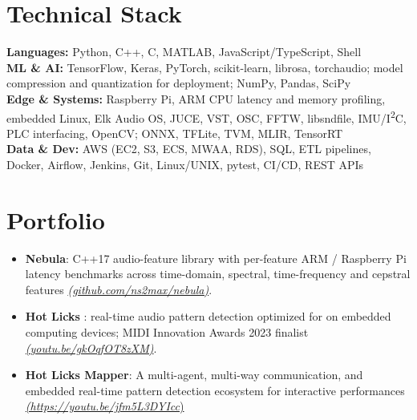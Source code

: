 \documentclass[11pt]{article}
\begin{document}
\section*{Technical Stack}

\textbf{Languages:} Python, C++, C, MATLAB, JavaScript/TypeScript, Shell\\
\textbf{ML \& AI:} TensorFlow, Keras, PyTorch, scikit-learn, librosa, torchaudio; model compression and quantization for deployment; NumPy, Pandas, SciPy\\
\textbf{Edge \& Systems:} Raspberry Pi, ARM CPU latency and memory profiling, embedded Linux, Elk Audio OS, JUCE, VST, OSC, FFTW, libsndfile, IMU/I\textsuperscript{2}C, PLC interfacing, OpenCV; ONNX, TFLite, TVM, MLIR, TensorRT\\
\textbf{Data \& Dev:} AWS (EC2, S3, ECS, MWAA, RDS), SQL, ETL pipelines, Docker, Airflow, Jenkins, Git, Linux/UNIX, pytest, CI/CD, REST APIs

\section*{Portfolio \footnotesize {}}
\begin{itemize}[leftmargin=1.2em, itemsep=-0.25em]
    \item \textbf{Nebula}: C++17 audio-feature library with per-feature ARM / Raspberry Pi latency benchmarks across time-domain, spectral, time-frequency and cepstral features \href{https://github.com/ns2max/nebula}{\textit{(github.com/ns2max/nebula)}}.
    \item \textbf{Hot Licks} : real-time audio pattern detection optimized for on embedded computing devices; MIDI Innovation Awards 2023 finalist \href{https://youtu.be/gkOqfOT8zXM}{\textit{(youtu.be/gkOqfOT8zXM)}}.
    \item \textbf{Hot Licks Mapper}: A multi-agent, multi-way communication, and embedded real-time pattern detection ecosystem for interactive performances \href{https://youtu.be/jfm5L3DYIcc}{\textit{(https://youtu.be/jfm5L3DYIcc})}
\end{itemize}
\end{document}
